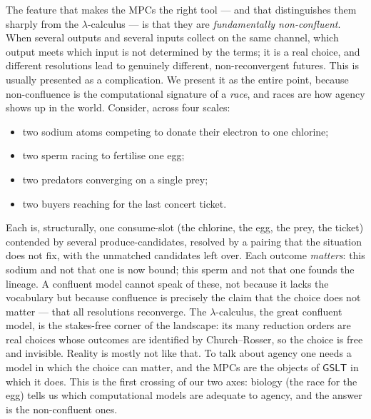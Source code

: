 \documentclass[11pt]{article}
\theoremstyle{definition}
\theoremstyle{plain}
\theoremstyle{remark}
\newcommand{\GSLT}{\mathsf{GSLT}}
\begin{document}
The feature that makes the MPCs the right tool --- and that distinguishes them
sharply from the $\lambda$-calculus --- is that they are \emph{fundamentally
non-confluent}. When several outputs and several inputs collect on the same channel,
which output meets which input is not determined by the terms; it is a real choice,
and different resolutions lead to genuinely different, non-reconvergent futures.
This is usually presented as a complication. We present it as the entire point,
because non-confluence is the computational signature of a \emph{race}, and races
are how agency shows up in the world. Consider, across four scales:

\begin{itemize}[leftmargin=1.4em]
\item two sodium atoms competing to donate their electron to one chlorine;
\item two sperm racing to fertilise one egg;
\item two predators converging on a single prey;
\item two buyers reaching for the last concert ticket.
\end{itemize}

\noindent
Each is, structurally, one consume-slot (the chlorine, the egg, the prey, the
ticket) contended by several produce-candidates, resolved by a pairing that the
situation does not fix, with the unmatched candidates left over. Each outcome
\emph{matters}: this sodium and not that one is now bound; this sperm and not that
one founds the lineage. A confluent model cannot speak of these, not because it
lacks the vocabulary but because confluence is precisely the claim that the choice
does not matter --- that all resolutions reconverge. The $\lambda$-calculus, the
great confluent model, is the stakes-free corner of the landscape: its many
reduction orders are real choices whose outcomes are identified by Church--Rosser,
so the choice is free and invisible. Reality is mostly not like that. To talk about
agency one needs a model in which the choice can matter, and the MPCs are the
objects of $\GSLT$ in which it does. This is the first crossing of our two axes:
biology (the race for the egg) tells us which computational models are adequate to
agency, and the answer is the non-confluent ones.
\end{document}
